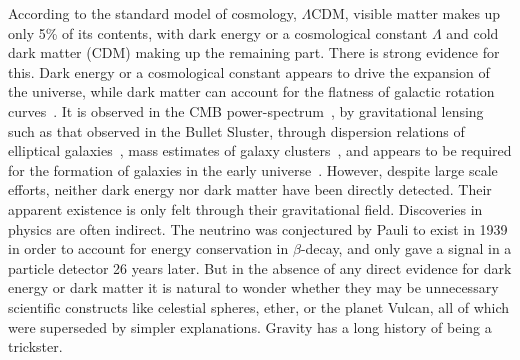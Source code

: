 \documentclass[aps,pra,amsmath,amssymb,amsthm,floatfix,nofootinbib,notitlepage,superscriptaddress,10pt]{revtex4-2}
\begin{document}
According to the standard model of cosmology, $\Lambda$CDM,  visible matter makes up only 5\% of its contents, with dark energy or a cosmological constant $\Lambda$  and cold dark matter (CDM) making up the remaining part. There is strong evidence for this. Dark energy or a cosmological constant appears to drive the expansion of the universe, while dark matter can account for the flatness of galactic rotation curves~\cite{rubin1978extended}. It is observed in the CMB power-spectrum~\cite{ade2016planck,hinshaw2009five}, by gravitational lensing~\cite{taylor1998gravitational} such as that observed in the Bullet Sluster, through dispersion relations of elliptical galaxies~\cite{faber1976velocity}, mass estimates of galaxy clusters~\cite{allen2011cosmological},
and appears to be required for the formation of galaxies in the early universe~\cite{Conselice_2014}. However, despite large scale efforts, neither dark energy nor dark matter have been directly detected. Their apparent existence is only felt through their gravitational field.  Discoveries in physics are often indirect. The neutrino was conjectured by Pauli to exist in 1939 in order to account for energy conservation in $\beta$-decay, and only gave a signal in a particle detector 26 years later. But in the absence of any direct evidence for dark energy or dark matter it is natural to wonder whether they may be unnecessary scientific constructs
like celestial spheres, ether, or the planet Vulcan, all of which were superseded by simpler explanations. Gravity has a long history of being a trickster.
\end{document}
